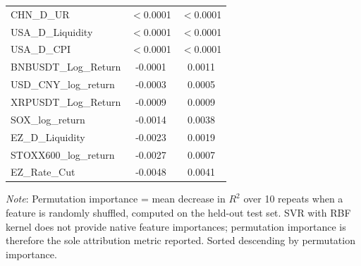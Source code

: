 \begin{tabular}{lcc}
  CHN\_D\_UR & $<$0.0001 & $<$0.0001 \\ 
  USA\_D\_Liquidity & $<$0.0001 & $<$0.0001 \\ 
  USA\_D\_CPI & $<$0.0001 & $<$0.0001 \\ 
  BNBUSDT\_Log\_Return & -0.0001 & 0.0011 \\ 
  USD\_CNY\_log\_return & -0.0003 & 0.0005 \\ 
  XRPUSDT\_Log\_Return & -0.0009 & 0.0009 \\ 
  SOX\_log\_return & -0.0014 & 0.0038 \\ 
  EZ\_D\_Liquidity & -0.0023 & 0.0019 \\ 
  STOXX600\_log\_return & -0.0027 & 0.0007 \\ 
  EZ\_Rate\_Cut & -0.0048 & 0.0041 \\ 
  \bottomrule
\end{tabular}
\par\vspace{4pt}
\begin{minipage}{\linewidth}
  \footnotesize \textit{Note}: Permutation importance = mean decrease in $R^2$ over 10 repeats when a feature is randomly shuffled, computed on the held-out test set. SVR with RBF kernel does not provide native feature importances; permutation importance is therefore the sole attribution metric reported. Sorted descending by permutation importance.
\end{minipage}